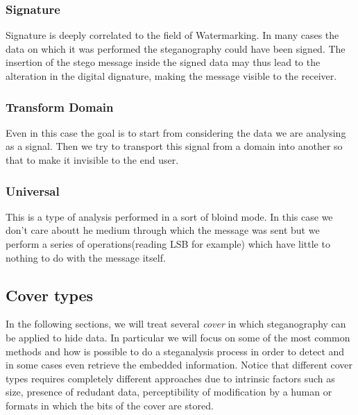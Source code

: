 \documentclass[../../main.tex]{subfiles}
\begin{document}
    \subsubsection{Signature}
    Signature is deeply correlated to the field of Watermarking. In many cases
    the data on which it was performed the steganography could have been signed.
    The insertion of the stego message inside the signed data may thus lead to
    the alteration in the digital dignature, making the message visible to the
    receiver.
    
    \subsubsection{Transform Domain}
    Even in this case the goal is to start from considering the data we are
    analysing as a signal. Then we try to transport this signal from a domain
    into another so that to make it invisible to the end user.
    
    \subsubsection{Universal}
    This is a type of analysis performed in a sort of bloind mode. In this case
    we don't care aboutt he medium through which the message was sent but we
    perform a series of operations(reading LSB for example) which have little to
    nothing to do with the message itself.

    \subsection{Cover types}
    In the following sections, we will treat several \emph{cover} in which
    steganography can be applied to hide data.
    In particular we will focus on some of the most common methods and how is
    possible to do a steganalysis process in order to detect and in some cases
    even retrieve the embedded information.
    Notice that different cover types requires completely different approaches
    due to intrinsic factors such as size, presence of redudant data,
    perceptibility of modification by a human or formats in which the bits of
    the cover are stored.
    
\end{document}
